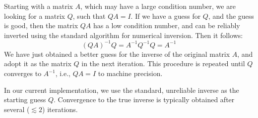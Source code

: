 \documentclass[modern]{aastex61}
\begin{document}
Starting with a matrix $A$, which may have a large condition number, we are looking for a matrix $Q$, such that $Q A = I$.
If we have a guess for $Q$, and the guess is good, then the matrix $QA$ has a low condition number, and can be reliably inverted using the standard algorithm for numerical inversion.
Then it follows:
\begin{equation*}
(QA)^{-1} Q = A^{-1} Q^{-1} Q = A^{-1}
\end{equation*}
We have just obtained a better guess for the inverse of the original matrix $A$, and adopt it as the matrix $Q$ in the next iteration.
This procedure is repeated until $Q$ converges to $A^{-1}$, i.e., $Q A = I$ to machine precision.

In our current implementation, we use the standard, unreliable inverse as the starting guess $Q$. 
Convergence to the true inverse is typically obtained after several ($\lesssim2$) iterations.
\end{document}
